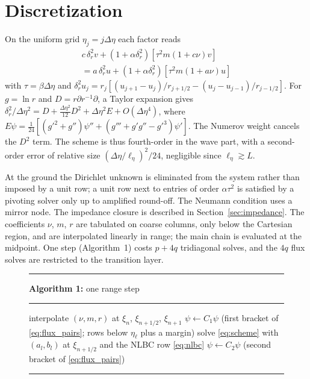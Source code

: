 \documentclass[journal]{IEEEtran}
\newcommand{\het}{\nu}
\newcommand{\etal}{\eta_{\ell}}
\newcommand{\pd}{\partial}
\begin{document}
\section{Discretization}\label{sec:disc}

On the uniform grid $\eta_j=j\Delta\eta$ each factor reads
\begin{multline}\label{eq:scheme}
c\,\delta^2_rv+(1+\alpha\delta^2_r)\left[\tau^2m(1+c\het)v\right]\\
=a\,\delta^2_ru+(1+\alpha\delta^2_r)\left[\tau^2m(1+a\het)u\right]
\end{multline}
with $\tau=\beta\Delta\eta$ and
$\delta^2_r u_j=r_j\left[(u_{j+1}-u_j)/r_{j+1/2}-(u_j-u_{j-1})/r_{j-1/2}\right]$.
For $g=\ln r$ and $D=r\pd r^{-1}\pd$, a Taylor
expansion gives
$\delta^2_r/\Delta\eta^2=D+\frac{\Delta\eta^2}{12}D^2+\Delta\eta^2E+O(\Delta\eta^4)$,
where $E\psi=\frac{1}{24}\left[(g'^2+g'')\psi''+(g'''+g'g''-g'^3)\psi'\right]$.
The Numerov weight cancels the $D^2$ term. The scheme is thus fourth-order in
the wave part, with a second-order error of relative size
$(\Delta\eta/\ell_\eta)^2/24$, negligible since $\ell_\eta\gtrsim L$.

At the ground the Dirichlet unknown is eliminated from the system rather than
imposed by a unit row; a unit row next to entries of order $\alpha\tau^2$ is
satisfied by a pivoting solver only up to amplified round-off. The Neumann
condition uses a mirror node. The impedance closure is described in
Section~\ref{sec:impedance}. The coefficients $\het$, $m$, $r$ are tabulated
on coarse columns, only below the Cartesian region, and are interpolated
linearly in range; the main chain is evaluated at the midpoint. One step
(Algorithm~1) costs $p+4q$ tridiagonal solves, and the $4q$ flux
solves are restricted to the transition layer.

\begin{figure}[!t]
\renewcommand{\algorithmicrequire}{\textbf{Input:}}
\hrule\vspace{2pt}
\textbf{Algorithm 1:} one range step
\vspace{2pt}\hrule
\begin{algorithmic}[1]
\STATE interpolate $(\het,m,r)$ at $\xi_n$, $\xi_{n+1/2}$, $\xi_{n+1}$
\STATE $\psi\leftarrow C_1\psi$ (first bracket of \eqref{eq:flux_pairs}; rows below $\etal$ plus a margin)
\STATE solve \eqref{eq:scheme} with $(a_l,b_l)$ at $\xi_{n+1/2}$ and the NLBC row \eqref{eq:nlbc}
\ENDFOR
\STATE $\psi\leftarrow C_2\psi$ (second bracket of \eqref{eq:flux_pairs})
\end{algorithmic}
\hrule
\end{figure}
\end{document}
